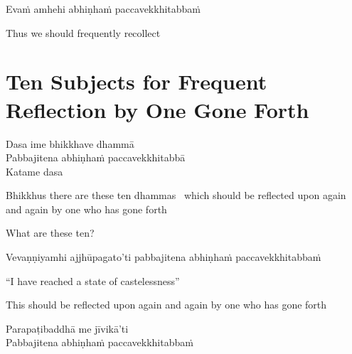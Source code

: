 Evaṁ amhehi abhiṇhaṁ paccavekkhitabbaṁ

\begin{english}
  Thus we should frequently recollect
\end{english}

\suttaRef{[AN 5.57]}


\section{Ten Subjects for Frequent Reflection by One Gone Forth}
\label{ten-recollections}

\begin{leader}
\end{leader}

Dasa ime bhikkhave dhammā\\
Pabbajitena abhiṇhaṁ paccavekkhitabbā\\
Katame dasa

\begin{english-hang}
  Bhikkhus there are these ten dhammas
  \breathmark\ which should be reflected upon again and again by one who has gone forth\\
\end{english-hang}

\begin{english}
  What are these ten?
\end{english}

\begin{pali-hang}
Vevaṇṇiyamhi ajjhūpagato'ti pabbajitena abhiṇhaṁ paccavekkhitabbaṁ
\end{pali-hang}

\begin{english}
  ``I have reached a state of castelessness''\\
\end{english}

\begin{english-hang}
  This should be reflected upon again and again by one who has gone forth
\end{english-hang}

Parapaṭibaddhā me jīvikā'ti\\
Pabbajitena abhiṇhaṁ paccavekkhitabbaṁ

